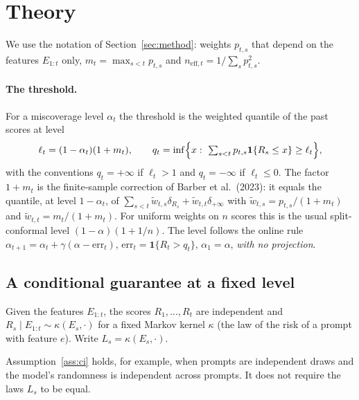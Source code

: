 
\section{Theory}\label{sec:theory}

We use the notation of Section~\ref{sec:method}: weights $p_{t,s}$ that depend on the features $E_{1:t}$ only, $m_t=\max_{s<t}p_{t,s}$ and $n_{\mathrm{eff},t}=1/\sum_s p_{t,s}^2$.

\paragraph{The threshold.}
For a miscoverage level $\alpha_t$ the threshold is the weighted quantile of the past scores at level
\[
 \ell_t=(1-\alpha_t)(1+m_t),\qquad
 q_t=\inf\Bigl\{x:\ \textstyle\sum_{s<t}p_{t,s}\mathbf 1\{R_s\le x\}\ge \ell_t\Bigr\},
\]
with the conventions $q_t=+\infty$ if $\ell_t>1$ and $q_t=-\infty$ if $\ell_t\le 0$.
The factor $1+m_t$ is the finite-sample correction of Barber et al.\ (2023): it equals the
quantile, at level $1-\alpha_t$, of $\sum_{s<t}\tilde w_{t,s}\delta_{R_s}+\tilde w_{t,t}\delta_{+\infty}$ with
$\tilde w_{t,s}=p_{t,s}/(1+m_t)$ and $\tilde w_{t,t}=m_t/(1+m_t)$. For uniform weights on $n$ scores
this is the usual split-conformal level $(1-\alpha)(1+1/n)$.
The level follows the online rule $\alpha_{t+1}=\alpha_t+\gamma(\alpha-\mathrm{err}_t)$,
$\mathrm{err}_t=\mathbf 1\{R_t>q_t\}$, $\alpha_1=\alpha$, \emph{with no projection}.

\subsection{A conditional guarantee at a fixed level}

\begin{assumption}\label{ass:ci}
Given the features $E_{1:t}$, the scores $R_1,\dots,R_t$ are independent and
$R_s\mid E_{1:t}\sim\kappa(E_s,\cdot)$ for a fixed Markov kernel $\kappa$ (the law of the risk of a prompt with feature $e$).
Write $L_s=\kappa(E_s,\cdot)$.
\end{assumption}

Assumption~\ref{ass:ci} holds, for example, when prompts are independent draws and the model's
randomness is independent across prompts. It does not require the laws $L_s$ to be equal.

